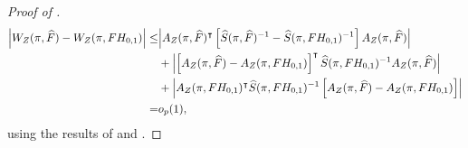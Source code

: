 \documentclass[12pt]{article}
\newcommand*{\tran}{\intercal}
\theoremstyle{plain}
\numberwithin{equation}{section}
\begin{document}
\begin{proof}[Proof of ]
\begin{align*}
\abs{
	W_{Z}(\pi, \widehat{F}) - W_{Z}(\pi, F H_{0, 1})
} 
\leq 
&\abs{
	A_Z(\pi, \widehat{F})^\tran 
	\left[ \widehat{S}(\pi, \widehat{F})^{-1} - \widehat{S}(\pi, FH_{0, 1})^{-1} \right] 
	A_Z(\pi, \widehat{F})
} \\
&+ \abs{
	\left[ A_Z(\pi, \widehat{F}) - A_Z(\pi, FH_{0, 1}) \right]^\tran 
	\widehat{S}(\pi, FH_{0, 1})^{-1} A_Z(\pi, \widehat{F})
} \\
&+
\abs{
	A_Z(\pi, FH_{0, 1})^\tran 
	\widehat{S}(\pi, FH_{0, 1})^{-1}
	\left[ A_Z(\pi, \widehat{F}) - A_Z(\pi, FH_{0, 1}) \right] 
} \\
= &o_p(1),
\end{align*}
using the results of  and .
\end{proof}
\end{document}
